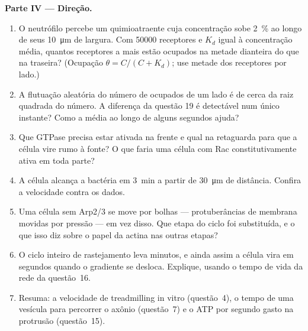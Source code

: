 \begin{problem}
\medskip
\noindent\textbf{Parte IV --- Direção.}
\begin{enumerate}[resume]
  \item O neutrófilo percebe um quimioatraente cuja concentração sobe
        \qty{2}{\%} ao longo de seus \qty{10}{\micro m} de largura. Com
        \num{50000} receptores e $K_{d}$ igual à concentração média,
        quantos receptores a mais estão ocupados na metade dianteira do
        que na traseira? (Ocupação $\theta = C/(C +
        K_{d})$; use metade
        dos receptores por lado.)
  \item A flutuação aleatória do número de ocupados de um lado é de
        cerca da raiz quadrada do número. A diferença da questão 19 é
        detectável num único instante? Como a média ao longo de alguns
        segundos ajuda?
  \item Que GTPase precisa estar ativada na frente e qual na retaguarda
        para que a célula vire rumo à fonte? O que faria uma célula com
        Rac constitutivamente ativa em toda parte?
  \item A célula alcança a bactéria em \qty{3}{min} a partir de
        \qty{30}{\micro m} de distância. Confira a velocidade contra os
        dados.
  \item Uma célula sem Arp2/3 se move por bolhas --- protuberâncias de
        membrana movidas por pressão --- em vez disso. Que etapa do
        ciclo foi substituída, e o que isso diz sobre o papel da actina
        nas outras etapas?
  \item O ciclo inteiro de rastejamento leva minutos, e ainda assim a
        célula vira em segundos quando o gradiente se desloca.
        Explique, usando o tempo de vida da rede da questão~16.
  \item Resuma: a velocidade de treadmilling in vitro (questão~4), o
        tempo de uma vesícula para percorrer o axônio (questão~7) e o
        ATP por segundo gasto na protrusão (questão~15).
\end{enumerate}
\end{problem}
